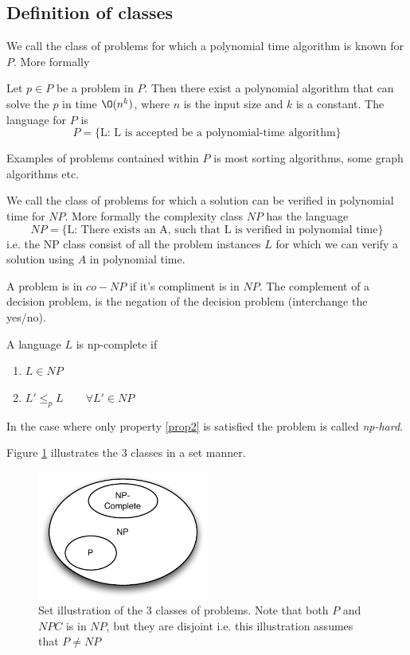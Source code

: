 \documentclass[10pt]{article}
\begin{document}


\subsection{Definition of classes} %
\label{sub:definition_of_classes}

We call the class of problems for which a polynomial time algorithm is known for $P$. More formally  
\begin{definition}
Let $p \in P$ be a problem in $P$. Then there exist a polynomial algorithm that can solve the $p$ in time $\O(n^k)$, where $n$ is the input size and $k$ is a constant. The language for $P$ is
\begin{equation}
  P = \{\text{L: L is accepted be a polynomial-time algorithm}\}
\end{equation}
\end{definition}
Examples of problems contained within $P$ is most sorting algorithms, some graph algorithms etc.

We call the class of problems for which a solution can be verified in polynomial time for $NP$. More formally the complexity class $NP$ has the language
\begin{equation}
  NP = \{\text{L: There exists an A, such that L is verified in polynomial time}\}
\end{equation}
i.e. the NP class consist of all the problem instances $L$ for which we can verify a solution using $A$ in polynomial time.

A problem is in $co-NP$ if it's compliment is in $NP$. The complement of a decision problem, is the negation of the decision problem (interchange the yes/no). 

A language $L$ is np-complete if 
\begin{enumerate}
  \item $L \in NP$
  \item $L' \leq_p L \qquad \forall L' \in NP$ \label{prop2}
\end{enumerate}
In the case where only property \ref{prop2} is satisfied the problem is called \emph{np-hard}.

Figure \ref{fig5} illustrates the 3 classes in a set manner.
\begin{figure}[ht]
\centering
\includegraphics[width=0.5\textwidth]{figures/fig5.pdf}
\caption{Set illustration of the 3 classes of problems. Note that both $P$ and $NPC$ is in $NP$, but they are disjoint i.e. this illustration assumes that $P \neq NP$}
\label{fig5}
\end{figure}
\end{document}
